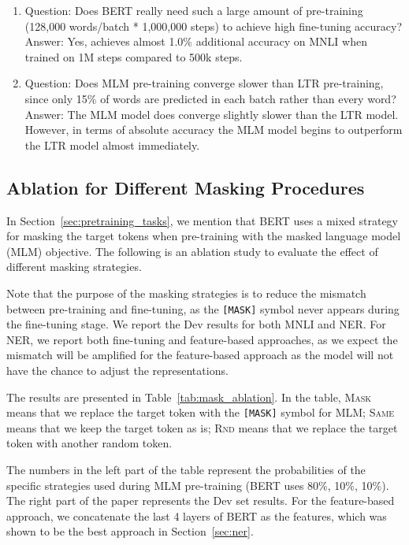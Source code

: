 \begin{enumerate}
\item Question: Does BERT really need such a large amount of pre-training (128,000 words/batch * 1,000,000 steps) to achieve high fine-tuning accuracy? \\
Answer: Yes, \bertbase achieves almost 1.0\% additional accuracy on MNLI when trained on 1M steps compared to 500k steps.
\item Question: Does MLM pre-training converge slower than LTR pre-training, since only 15\% of words are predicted in each batch rather than every word? \\
Answer: The MLM model does converge slightly slower than the LTR model. However, in terms of absolute accuracy the MLM model begins to outperform the LTR model almost immediately.
\end{enumerate}

\subsection{Ablation for Different Masking Procedures}
\label{appendix:sec:different_masks}

In Section~\ref{sec:pretraining_tasks}, we mention that BERT uses a mixed strategy for masking the target tokens when pre-training with the masked language
model (MLM) objective. The following is an ablation study to evaluate the effect of different masking strategies.

Note that the purpose of the masking strategies is to reduce the mismatch
between pre-training and fine-tuning, as the {\tt [MASK]} symbol never appears during the fine-tuning stage. We report the Dev results for both
MNLI and NER. For NER, we report both fine-tuning and feature-based approaches,
as we expect the mismatch will be amplified for the feature-based approach as
the model will not have the chance to adjust the representations.



The results are presented in Table~\ref{tab:mask_ablation}. In the table,
 \textsc{Mask} means that we replace the target token with the {\tt [MASK]} symbol
for MLM; \textsc{Same} means that we keep the target token as is; \textsc{Rnd}
means that we replace the target token with another random token. 

The numbers in the left part of the table represent the probabilities of the specific strategies used during MLM pre-training (BERT uses 80\%, 10\%, 10\%). The right part of the paper represents the Dev set results. For the feature-based
approach, we concatenate the last 4 layers of BERT as the features, which
was shown to be the best approach in Section~\ref{sec:ner}.

